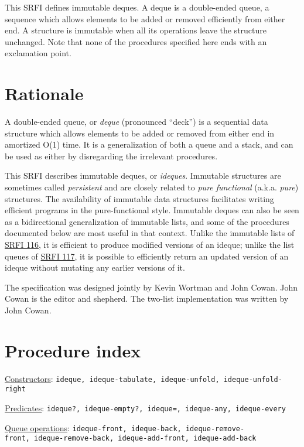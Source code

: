 This SRFI defines immutable deques. A deque is a double-ended queue, a
sequence which allows elements to be added or removed efficiently from
either end. A structure is immutable when all its operations leave the
structure unchanged. Note that none of the procedures specified here
ends with an exclamation point.

\section{Rationale}\label{rationale}

A double-ended queue, or \emph{deque} (pronounced ``deck'') is a
sequential data structure which allows elements to be added or removed
from either end in amortized O(1) time. It is a generalization of both a
queue and a stack, and can be used as either by disregarding the
irrelevant procedures.

This SRFI describes immutable deques, or \emph{ideques}. Immutable
structures are sometimes called \emph{persistent} and are closely
related to \emph{pure functional} (a.k.a. \emph{pure}) structures. The
availability of immutable data structures facilitates writing efficient
programs in the pure-functional style. Immutable deques can also be seen
as a bidirectional generalization of immutable lists, and some of the
procedures documented below are most useful in that context. Unlike the
immutable lists of
\href{http://srfi.schemers.org/srfi-116/srfi-116.html}{SRFI 116}, it is
efficient to produce modified versions of an ideque; unlike the list
queues of \href{http://srfi.schemers.org/srfi-117/srfi-117.html}{SRFI
117}, it is possible to efficiently return an updated version of an
ideque without mutating any earlier versions of it.

The specification was designed jointly by Kevin Wortman and John Cowan.
John Cowan is the editor and shepherd. The two-list implementation was
written by John Cowan.

\section{Procedure index}\label{procedure-index}

\protect\hyperlink{Constructors}{Constructors}:
\texttt{ideque,\ ideque-tabulate,\ ideque-unfold,\ ideque-unfold-right}

\protect\hyperlink{Predicates}{Predicates}:
\texttt{ideque?,\ ideque-empty?,\ ideque=,\ ideque-any,\ ideque-every}

\protect\hyperlink{Queueoperations}{Queue operations}:
\texttt{ideque-front,\ ideque-back,\ ideque-remove-front,\ ideque-remove-back,\ ideque-add-front,\ ideque-add-back}

